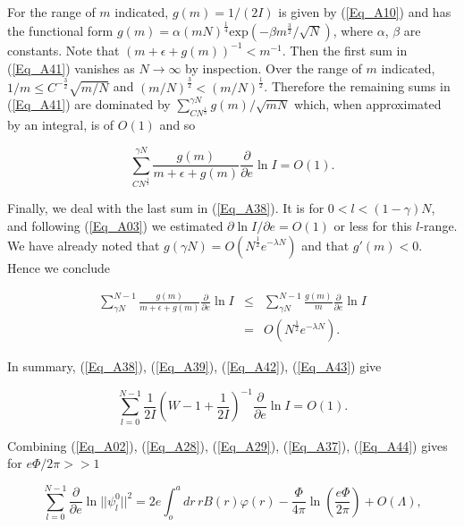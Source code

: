 \documentclass[a4paper,twocolumn,showpacs,preprintnumbers,amsmath,amssymb]{revtex4}
\newcommand{\half}{\frac{1}{2}}
\newcommand{\pdo}[1]{\ensuremath{\frac{\partial }
        {\partial #1 }}}
\begin{document}
\noindent
For the range of $m$ indicated, $g(m) = 1 / (2I)$ is given by
(\ref{Eq_A10}) and has the functional form
$g(m) = \alpha (mN)^{\frac{1}{4}} \text{exp}(-\beta m^{\frac{3}{2}}/\sqrt{N})$, 
where $\alpha$, $\beta$ are constants. Note that
$(m + \epsilon + g(m))^{-1} < m^{-1}$. Then the first sum in
(\ref{Eq_A41}) vanishes as $N \to \infty$ by inspection. Over the
range of $m$ indicated, $1/m \le C^{-\frac{3}{2}} \sqrt{m/N}$ and
$(m/N)^{\frac{3}{2}} < (m/N)^{\half}$. Therefore the remaining sums in
(\ref{Eq_A41}) are dominated by
$\sum^{\gamma N}_{CN^{\frac{1}{3}}} g(m) / \sqrt{m N}$ which, when
approximated by an integral, is of $O(1)$ and so

\begin{equation}
\label{Eq_A42}
\sum^{\gamma N}_{CN^{\frac{1}{3}}}
  \frac{g(m)}{m + \epsilon + g(m)} \pdo{e} \ln I = O(1).
\end{equation}

Finally, we deal with the last sum in (\ref{Eq_A38}). It is for
$0 < l < (1 - \gamma) N$, and following (\ref{Eq_A03}) we estimated
$\partial\ln I / \partial e = O(1)$ or less for this $l$-range. We
have already noted that $g(\gamma N) = O(N^{\half} e^{-\lambda N})$
and that $g'(m) < 0$. Hence we conclude

\begin{eqnarray}
\nonumber
\sum^{N-1}_{\gamma N} \frac{g(m)}{m + \epsilon + g(m)}
\pdo{e} \ln I
  &\le& \sum^{N-1}_{\gamma N} \frac{g(m)}{m} \pdo{e} \ln I\\
\label{Eq_A43}
  &=& O( N^{\half} e^{-\lambda N}).
\end{eqnarray}

In summary, (\ref{Eq_A38}), (\ref{Eq_A39}), (\ref{Eq_A42}),
(\ref{Eq_A43}) give

\begin{equation}
\label{Eq_A44}
\sum^{N-1}_{l=0} \frac{1}{2I} \left( W - 1 + \frac{1}{2I} \right)^{-1}
  \pdo{e} \ln I = O(1).
\end{equation}

\noindent
Combining (\ref{Eq_A02}), (\ref{Eq_A28}), (\ref{Eq_A29}),
(\ref{Eq_A37}), (\ref{Eq_A44}) gives for $e\Phi/2\pi >> 1$

\begin{widetext}
\begin{equation}
\label{Eq_A45}
\sum^{N-1}_{l=0} \pdo{e} \ln ||\psi^0_l||^2
  = 2e \int^a_o dr \, r B(r) \varphi(r)
    - \frac{\Phi}{4 \pi} \ln \left(\frac{e\Phi}{2\pi}\right) + O(\Lambda),
\end{equation}
\end{widetext}
\end{document}
